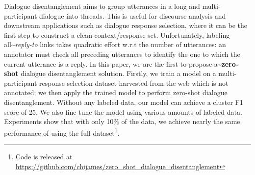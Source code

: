 Dialogue disentanglement aims to group utterances in a long and multi-participant dialogue into threads. This is useful for discourse analysis and downstream applications such as dialogue response selection, where it can be the first step to construct a clean context/response set. Unfortunately, labeling all{\textasciitilde}\emph{reply-to} links takes quadratic effort w.r.t the number of utterances: an annotator must check all preceding utterances to identify the one to which the current utterance is a reply. In this paper, we are the first to propose a{\textasciitilde}\textbf{zero-shot} dialogue disentanglement solution. Firstly, we train a model on a multi-participant response selection dataset harvested from the web which is not annotated; we then apply the trained model to perform zero-shot dialogue disentanglement. Without any labeled data, our model can achieve a cluster F1 score of 25. We also fine-tune the model using various amounts of labeled data. Experiments show that with only 10\% of the data, we achieve nearly the same performance of using the full dataset\footnote{Code is released at \url{https://github.com/chijames/zero\_shot\_dialogue\_disentanglement}}.
